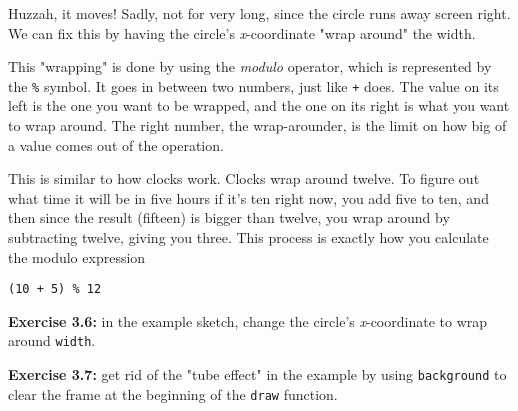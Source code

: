 \documentclass[
]{leaflet}
\begin{document}
Huzzah, it moves!
Sadly, not for very long, since the circle runs away screen right.
We can fix this by having the circle's \textit{x}-coordinate "wrap around" the width.

This "wrapping" is done by using the \textit{modulo} operator, which is represented by the \texttt{\%} symbol.
It goes in between two numbers, just like \texttt{+} does.
The value on its left is the one you want to be wrapped, and the one on its right is what you want to wrap around.
The right number, the wrap-arounder, is the limit on how big of a value comes out of the operation.

This is similar to how clocks work.
Clocks wrap around twelve.
To figure out what time it will be in five hours if it's ten right now, you add five to ten, and then since the result (fifteen) is bigger than twelve, you wrap around by subtracting twelve, giving you three.
This process is exactly how you calculate the modulo expression
\begin{lstlisting}
(10 + 5) % 12
\end{lstlisting}
\vspace{-0.5em}

\textbf{Exercise 3.6:} in the example sketch, change the circle's \textit{x}-coordinate to wrap around \texttt{width}.

\textbf{Exercise 3.7:} get rid of the "tube effect" in the example by using \texttt{background} to clear the frame at the beginning of the \texttt{draw} function.

\loggingall
\end{document}
